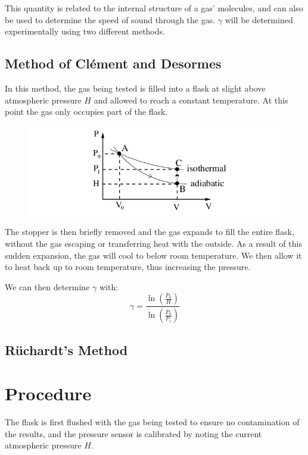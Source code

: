 \documentclass[12pt]{article}
\begin{document}
This quantity is related to the internal structure of a gas' molecules, and can also be used to determine the speed of sound through the gas. $\gamma$ will be determined experimentally using two different methods.

\subsection{Method of Clément and Desormes}
In this method, the gas being tested is filled into a flask at slight above atmospheric pressure $H$ and allowed to reach a constant temperature. At this point the gas only occupies part of the flask.

\begin{figure}[h]
	\includegraphics[width=1\textwidth]{Figures/Clement_Theory1}
\end{figure}
The stopper is then briefly removed and the gas expands to fill the entire flask, without the gas escaping or transferring heat with the outside. As a result of this sudden expansion, the gas will cool to below room temperature. We then allow it to heat back up to room temperature, thus increasing the pressure.



We can then determine $\gamma$ with:
\begin{equation}
	\gamma = \frac{\ln \left( \frac{P_0}{H} \right)}{\ln \left( \frac{P_0}{P_1} \right)}
\end{equation}

\subsection{Rüchardt’s Method}

\section{Procedure}
The flask is first flushed with the gas being tested to ensure no contamination of the results, and the pressure sensor is calibrated by noting the current atmospheric pressure $H$.
\end{document}

